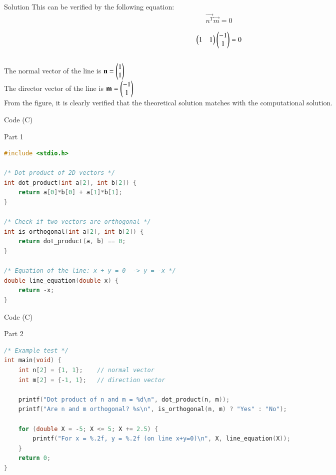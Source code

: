 \documentclass{beamer}
\begin{document}
\begin{frame}{Solution}
This can be verified by the following equation:
\begin{align}
\vec{n^T}\vec{m} = 0
\end{align}

\begin{align}
\begin{pmatrix}1 & 1\end{pmatrix}\begin{pmatrix}-1 \\ 1\end{pmatrix} = 0
\end{align}\\



The normal vector of the line is $\mathbf{n} = \begin{pmatrix}1 \\ 1\end{pmatrix}$\\
The director vector of the line is $\mathbf{m} = \begin{pmatrix}-1 \\ 1\end{pmatrix}$\\

From the figure, it is clearly verified that the theoretical solution matches with the computational solution.\\
\end{frame}


\begin{frame}[fragile]{ Code (C)}
\begin{block}{Part 1}
\begin{lstlisting}[language=C, basicstyle=\ttfamily\small, keywordstyle=\color{blue}, frame=single]
#include <stdio.h>

/* Dot product of 2D vectors */
int dot_product(int a[2], int b[2]) {
    return a[0]*b[0] + a[1]*b[1];
}

/* Check if two vectors are orthogonal */
int is_orthogonal(int a[2], int b[2]) {
    return dot_product(a, b) == 0;
}

/* Equation of the line: x + y = 0  -> y = -x */
double line_equation(double x) {
    return -x;
}

\end{lstlisting}
\end{block}
\end{frame}

\begin{frame}[fragile]{ Code (C)}
\begin{block}{Part 2}
\begin{lstlisting}[language=C, basicstyle=\ttfamily\small, keywordstyle=\color{blue}, frame=single]
/* Example test */
int main(void) {
    int n[2] = {1, 1};    // normal vector
    int m[2] = {-1, 1};   // direction vector

    printf("Dot product of n and m = %d\n", dot_product(n, m));
    printf("Are n and m orthogonal? %s\n", is_orthogonal(n, m) ? "Yes" : "No");

    for (double X = -5; X <= 5; X += 2.5) {
        printf("For x = %.2f, y = %.2f (on line x+y=0)\n", X, line_equation(X));
    }
    return 0;
}
\end{lstlisting}
\end{block}
\end{frame}
\end{document}
